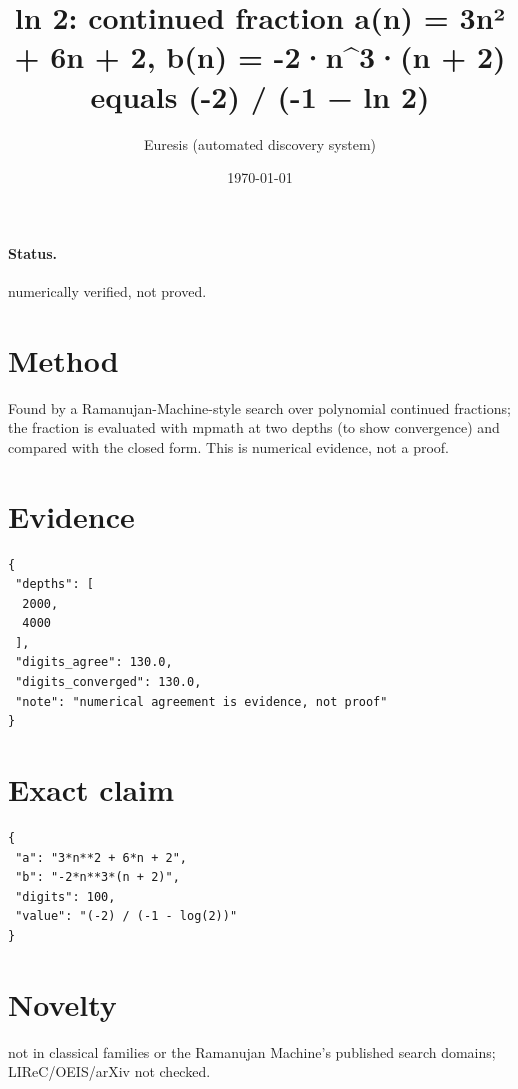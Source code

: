 \documentclass[11pt]{article}
\title{ln 2: continued fraction a(n) = 3n² + 6n + 2, b(n) = -2·n\^{}3·(n + 2) equals (-2) / (-1 − ln 2)}
\author{Euresis (automated discovery system)}
\date{\today}
\begin{document}
\maketitle
\paragraph{Status.} numerically verified, not proved.
\section{Method}
Found by a Ramanujan-Machine-style search over polynomial continued fractions; the fraction is evaluated with mpmath at two depths (to show convergence) and compared with the closed form. This is numerical evidence, not a proof.
\section{Evidence}
\begin{verbatim}
{
 "depths": [
  2000,
  4000
 ],
 "digits_agree": 130.0,
 "digits_converged": 130.0,
 "note": "numerical agreement is evidence, not proof"
}
\end{verbatim}
\section{Exact claim}
\begin{verbatim}
{
 "a": "3*n**2 + 6*n + 2",
 "b": "-2*n**3*(n + 2)",
 "digits": 100,
 "value": "(-2) / (-1 - log(2))"
}
\end{verbatim}
\section{Novelty}
not in classical families or the Ramanujan Machine's published search domains; LIReC/OEIS/arXiv not checked.
\end{document}
